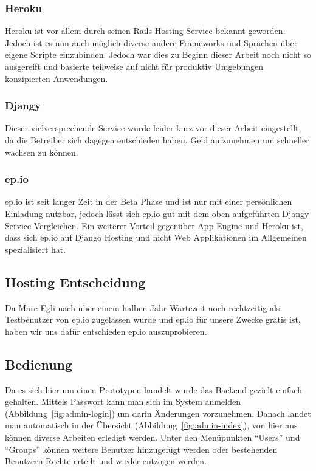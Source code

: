 \subsubsection{Heroku} %
\label{ssub:Heroku}
Heroku ist vor allem durch seinen Rails Hosting Service bekannt geworden. Jedoch ist es nun auch möglich diverse andere Frameworks und Sprachen über eigene Scripte einzubinden. Jedoch war dies zu Beginn dieser Arbeit noch nicht so ausgereift und basierte teilweise auf nicht für produktiv Umgebungen konzipierten Anwendungen.

\subsubsection{Djangy} %
\label{ssub:Djangy}
Dieser vielversprechende Service wurde leider kurz vor dieser Arbeit eingestellt, da die Betreiber sich dagegen entschieden haben, Geld aufzunehmen um schneller wachsen zu können.

\subsubsection{ep.io} %
\label{ssub:ep.io}
ep.io ist seit langer Zeit in der Beta Phase und ist nur mit einer persönlichen Einladung nutzbar, jedoch lässt sich ep.io gut mit dem oben aufgeführten Djangy Service Vergleichen. Ein weiterer Vorteil gegenüber App Engine und Heroku ist, dass sich ep.io auf Django Hosting und nicht Web Applikationen im Allgemeinen spezialisiert hat.


\subsection{Hosting Entscheidung} %
\label{sub:Hosting Entscheidung}
Da Marc Egli nach über einem halben Jahr Wartezeit noch rechtzeitig als Testbenutzer von ep.io zugelassen wurde und ep.io für unsere Zwecke gratis ist, haben wir uns dafür entschieden ep.io auszuprobieren.

\subsection{Bedienung} %
\label{sub:Bedienung}
Da es sich hier um einen Prototypen handelt wurde das Backend gezielt einfach gehalten. Mittels Passwort kann man sich im System anmelden (Abbildung~\ref{fig:admin-login}) um darin Änderungen vorzunehmen. Danach landet man automatisch in der Übersicht (Abbildung~\ref{fig:admin-index}), von hier aus können diverse Arbeiten erledigt werden. Unter den Menüpunkten "`Users"' und "`Groups"' können weitere Benutzer hinzugefügt werden oder bestehenden Benutzern Rechte erteilt und wieder entzogen werden.

